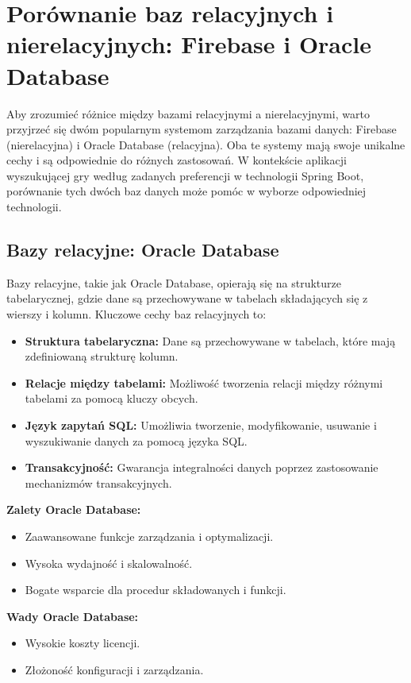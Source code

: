 \section{Porównanie baz relacyjnych i nierelacyjnych: Firebase i Oracle Database}

Aby zrozumieć różnice między bazami relacyjnymi a nierelacyjnymi, warto przyjrzeć się dwóm popularnym systemom zarządzania bazami danych: Firebase (nierelacyjna) i Oracle Database (relacyjna). Oba te systemy mają swoje unikalne cechy i są odpowiednie do różnych zastosowań. W kontekście aplikacji wyszukującej gry według zadanych preferencji w technologii Spring Boot, porównanie tych dwóch baz danych może pomóc w wyborze odpowiedniej technologii.

\subsection{Bazy relacyjne: Oracle Database}

Bazy relacyjne, takie jak Oracle Database, opierają się na strukturze tabelarycznej, gdzie dane są przechowywane w tabelach składających się z wierszy i kolumn. Kluczowe cechy baz relacyjnych to:

\begin{itemize}
\item \textbf{Struktura tabelaryczna:} Dane są przechowywane w tabelach, które mają zdefiniowaną strukturę kolumn.
\item \textbf{Relacje między tabelami:} Możliwość tworzenia relacji między różnymi tabelami za pomocą kluczy obcych.
\item \textbf{Język zapytań SQL:} Umożliwia tworzenie, modyfikowanie, usuwanie i wyszukiwanie danych za pomocą języka SQL.
\item \textbf{Transakcyjność:} Gwarancja integralności danych poprzez zastosowanie mechanizmów transakcyjnych.
\end{itemize}

\textbf{Zalety Oracle Database:}
\begin{itemize}
\item Zaawansowane funkcje zarządzania i optymalizacji.
\item Wysoka wydajność i skalowalność.
\item Bogate wsparcie dla procedur składowanych i funkcji.
\end{itemize}

\textbf{Wady Oracle Database:}
\begin{itemize}
\item Wysokie koszty licencji.
\item Złożoność konfiguracji i zarządzania.
\end{itemize}

